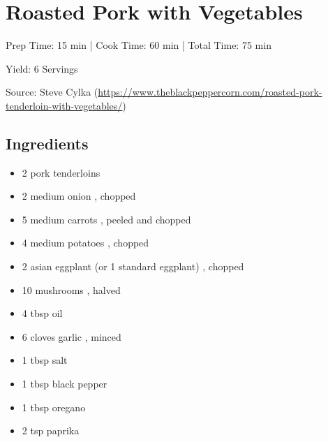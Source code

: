 \section{Roasted Pork with Vegetables}

\begin{center}
Prep Time: 15 min |
Cook Time: 60 min |
Total Time: 75 min

\noindent Yield: 6 Servings

\vspace{1em}

    Source: Steve Cylka (\url{https://www.theblackpeppercorn.com/roasted-pork-tenderloin-with-vegetables/})
\end{center}

\subsection{Ingredients}
\begin{multicols}{2}
\begin{itemize}
    \item 2 pork tenderloins
    \item 2 medium onion , chopped
    \item 5 medium carrots , peeled and chopped
    \item 4 medium potatoes , chopped
    \item 2 asian eggplant (or 1 standard eggplant) , chopped
    \item 10 mushrooms , halved
    \item 4 tbsp oil
    \item 6 cloves garlic , minced
    \item 1 tbsp salt
    \item 1 tbsp black pepper
    \item 1 tbsp oregano
    \item 2 tsp paprika
\end{itemize}
\end{multicols}


